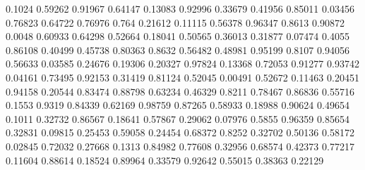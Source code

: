 \documentclass{article}
\newenvironment{eulernotebook}{\par}{\par}
\newenvironment{eulercomment}{\par\medskip}{\par\medskip}
\begin{document}
\begin{eulernotebook}
\begin{eulercomment}
\begin{eulercomment}
\begin{eulercomment}
\begin{eulercomment}
\begin{eulercomment}
\begin{eulercomment}
\begin{euleroutput}
               0.1024
              0.59262
              0.91967
              0.64147
              0.13083
              0.92996
              0.33679
              0.41956
              0.85011
              0.03456
              0.76823
              0.64722
              0.76976
                0.764
              0.21612
              0.11115
              0.56378
              0.96347
               0.8613
              0.90872
               0.0048
              0.60933
              0.64298
              0.52664
              0.18041
              0.50565
              0.36013
              0.31877
              0.07474
               0.4055
              0.86108
              0.40499
              0.45738
              0.80363
               0.8632
              0.56482
              0.48981
              0.95199
               0.8107
              0.94056
              0.56633
              0.03585
              0.24676
              0.19306
              0.20327
              0.97824
              0.13368
              0.72053
              0.91277
              0.93742
              0.04161
              0.73495
              0.92153
              0.31419
              0.81124
              0.52045
              0.00491
              0.52672
              0.11463
              0.20451
              0.94158
              0.20544
              0.83474
              0.88798
              0.63234
              0.46329
               0.8211
              0.78467
              0.86836
              0.55716
               0.1553
               0.9319
              0.84339
              0.62169
              0.98759
              0.87265
              0.58933
              0.18988
              0.90624
              0.49654
               0.1011
              0.32732
              0.86567
              0.18641
              0.57867
              0.29062
              0.07976
               0.5855
              0.96359
              0.85654
              0.32831
              0.09815
              0.25453
              0.59058
              0.24454
              0.68372
               0.8252
              0.32702
              0.50136
              0.58172
              0.02845
              0.72032
              0.27668
               0.1313
              0.84982
              0.77608
              0.32956
              0.68574
              0.42373
              0.77217
              0.11604
              0.88614
              0.18524
              0.89964
              0.33579
              0.92642
              0.55015
              0.38363
              0.22129

\end{euleroutput}
\end{eulercomment}
\end{eulercomment}
\end{eulercomment}
\end{eulercomment}
\end{eulercomment}
\end{eulercomment}
\end{eulernotebook}
\end{document}
